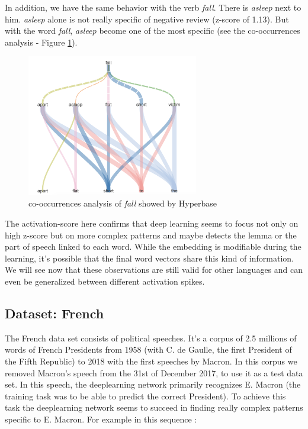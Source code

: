 In addition, we have the same behavior with the verb \textit{fall}. There is \textit{asleep} next to him. \textit{asleep} alone is not really specific of negative review (z-score of 1.13). But with the word \textit{fall}, \textit{asleep} become one of the most specific (see the co-occurrences analysis - Figure \ref{fall}).

\begin{figure}[h]
\begin{center}
\includegraphics[width=7.5cm]{img/cooc_english.png}
\caption{co-occurrences analysis of \textit{fall} showed by Hyperbase}
\label{fall}
\end{center}
\end{figure}

The activation-score here confirms that deep learning seems to focus not only on high z-score but on more complex patterns and maybe detects the lemma or the part of speech linked to each word. While the embedding is modifiable during the learning, it's possible that the final word vectors share this kind of information. We will see now that these observations are still valid for other languages and can even be generalized between different activation spikes.

\subsection{Dataset: French}

The French data set consists of political speeches. It's a corpus of 2.5 millions of words of French Presidents from 1958 (with C. de Gaulle, the first President of the Fifth Republic) to 2018 with the first speeches by Macron. In this corpus we removed Macron's speech from the 31st of December 2017, to use it as a test data set. In this speech, the deeplearning network primarily recognizes E. Macron (the training task was to be able to predict the correct President). To achieve this task the deeplearning network seems to succeed in finding really complex patterns specific to E. Macron. For example in this sequence :

